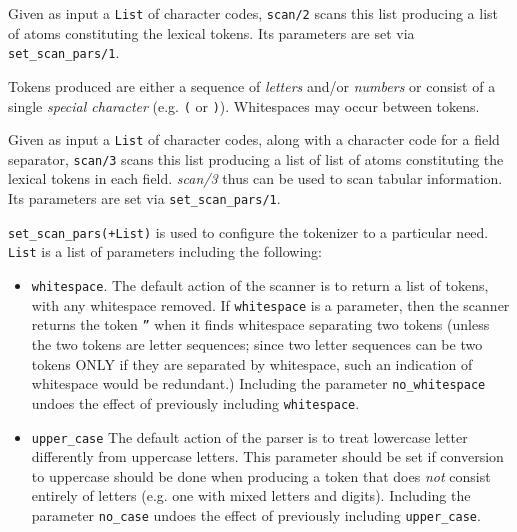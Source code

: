 \begin{description}


Given as input a {\tt List} of character codes, {\tt scan/2} scans
this list producing a list of atoms constituting the lexical tokens.
Its parameters are set via {\tt set\_scan\_pars/1}.

Tokens produced are either a sequence of {\em letters} and/or {\em
numbers} or consist of a single {\em special character} (e.g. {\tt (}
or {\tt )}).  Whitespaces may occur between tokens.


Given as input a {\tt List} of character codes, along with a character
code for a field separator, {\tt scan/3} scans this list producing a
list of list of atoms constituting the lexical tokens in each field.
{\em scan/3} thus can be used to scan tabular information.  Its
parameters are set via {\tt set\_scan\_pars/1}.


{\tt set\_scan\_pars(+List)} is used to configure the tokenizer to a
particular need.  {\tt List} is a list of parameters including the
following:

\begin{itemize}

\item{{\tt whitespace}}.  The default action of the scanner is to return a
list of tokens, with any whitespace removed.  If {\tt whitespace} is a
parameter, then the scanner returns the token {\tt ''} when it finds
whitespace separating two tokens (unless the two tokens are letter
sequences; since two letter sequences can be two tokens ONLY if they
are separated by whitespace, such an indication of whitespace would be
redundant.)  Including the parameter {\tt no\_whitespace} undoes the
effect of previously including {\tt whitespace}.

\item{{\tt upper\_case}} The default action of the parser is to treat
lowercase letter differently from uppercase letters.  This parameter
should be set if conversion to uppercase should be done when producing
a token that does {\em not} consist entirely of letters (e.g. one with
mixed letters and digits).  Including the parameter {\tt no\_case}
undoes the effect of previously including {\tt upper\_case}.


\end{itemize}
\end{description}
